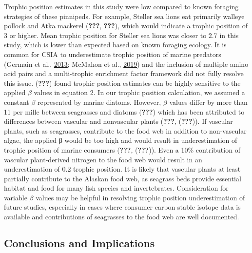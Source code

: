 \documentclass [11pt, proquest] {uwthesis}[2015/03/03]
\begin{document}
Trophic position estimates in this study were low compared to known
foraging strategies of these pinnipeds. For example, Steller sea lions
eat primarily walleye pollock and Atka mackerel ({\textbf{???}},
{\textbf{???}}), which would indicate a trophic position of 3 or higher.
Mean trophic position for Steller sea lions was closer to 2.7 in this
study, which is lower than expected based on known foraging ecology. It
is common for CSIA to underestimate trophic position of marine predators
(Germain et al., \protect\hyperlink{ref-Germain2013}{2013}; McMahon et
al., \protect\hyperlink{ref-McMahon2019}{2019}) and the inclusion of
multiple amino acid pairs and a multi-trophic enrichment factor
framework did not fully resolve this issue. ({\textbf{???}}) found
trophic position estimates can be highly sensitive to the applied
\(\beta\) values in equation 2. In our trophic position calculation, we
assumed a constant \(\beta\) represented by marine diatoms. However,
\(\beta\) values differ by more than 11 per mille between seagrasses and
diatoms ({\textbf{???}}) which has been attributed to differences
between vascular and nonvascular plants ({\textbf{???}},
({\textbf{???}})). If vascular plants, such as seagrasses, contribute to
the food web in addition to non-vascular algae, the applied β would be
too high and would result in underestimation of trophic position of
marine consumers ({\textbf{???}}, ({\textbf{???}})). Even a 10\%
contribution of vascular plant-derived nitrogen to the food web would
result in an underestimation of 0.2 trophic position. It is likely that
vascular plants at least partially contribute to the Alaskan food web,
as seagrass beds provide essential habitat and food for many fish
species and invertebrates. Consideration for variable \(\beta\) values
may be helpful in resolving trophic position underestimation of future
studies, especially in cases where consumer carbon stable isotope data
is available and contributions of seagrasses to the food web are well
documented.

\subsection{Conclusions and
Implications}\label{conclusions-and-implications}
\end{document}
